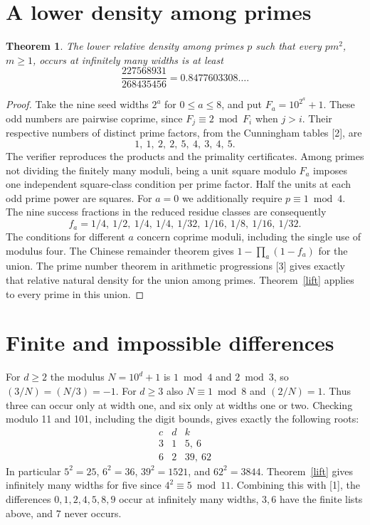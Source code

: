 \documentclass[11pt,letterpaper]{article}
\newtheorem{theorem}{Theorem}\newtheorem{lemma}[theorem]{Lemma}
\begin{document}
\section{A lower density among primes}
\begin{theorem}
The lower relative density among primes $p$ such that every $pm^2$, $m\ge1$, occurs at infinitely many widths is at least
\[
 \frac{227568931}{268435456}=0.8477603308\ldots .
\]
\end{theorem}
\begin{proof}
Take the nine seed widths $2^a$ for $0\le a\le8$, and put $F_a=10^{2^a}+1$. These odd numbers are pairwise coprime, since $F_j\equiv2\bmod F_i$ when $j>i$. Their respective numbers of distinct prime factors, from the Cunningham tables [2], are
\[
 1,\ 1,\ 2,\ 2,\ 5,\ 4,\ 3,\ 4,\ 5.
\]
The verifier reproduces the products and the primality certificates. Among primes not dividing the finitely many moduli, being a unit square modulo $F_a$ imposes one independent square-class condition per prime factor. Half the units at each odd prime power are squares. For $a=0$ we additionally require $p\equiv1\bmod4$. The nine success fractions in the reduced residue classes are consequently
\[
 f_a=1/4,\ 1/2,\ 1/4,\ 1/4,\ 1/32,\ 1/16,\ 1/8,\ 1/16,\ 1/32 .
\]
The conditions for different $a$ concern coprime moduli, including the single use of modulus four. The Chinese remainder theorem gives $1-\prod_a(1-f_a)$ for the union. The prime number theorem in arithmetic progressions [3] gives exactly that relative natural density for the union among primes. Theorem~\ref{lift} applies to every prime in this union.
\end{proof}

\section{Finite and impossible differences}
For $d\ge2$ the modulus $N=10^d+1$ is $1\bmod4$ and $2\bmod3$, so $(3/N)=(N/3)=-1$. For $d\ge3$ also $N\equiv1\bmod8$ and $(2/N)=1$. Thus three can occur only at width one, and six only at widths one or two. Checking modulo 11 and 101, including the digit bounds, gives exactly the following roots:
\[
\begin{array}{c|c|c}
 c & d & k\\ \hline
 3&1&5,\ 6\\
 6&2&39,\ 62
\end{array}
\]
In particular $5^2=25$, $6^2=36$, $39^2=1521$, and $62^2=3844$. Theorem~\ref{lift} gives infinitely many widths for five since $4^2\equiv5\bmod11$. Combining this with [1], the differences $0,1,2,4,5,8,9$ occur at infinitely many widths, $3,6$ have the finite lists above, and $7$ never occurs.
\end{document}
